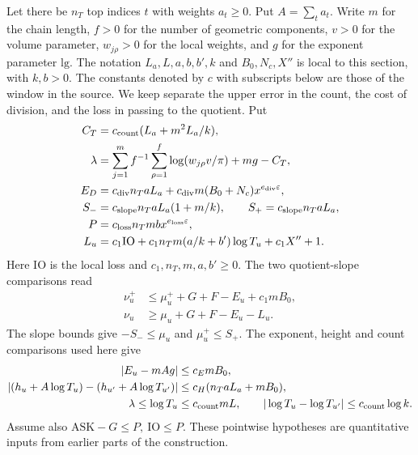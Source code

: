 Let there be \(n_T\) top indices \(t\) with weights \(a_t\ge0\).
Put \(A=\sum_t a_t\). Write \(m\) for the chain length, \(f>0\) for
the number of geometric components, \(v>0\) for the volume parameter,
\(w_{j\rho}>0\) for the local weights, and \(g\) for the exponent
parameter \(\mathrm{lg}\). The notation \(L_a,L,a,b,b',k\) and
\(B_0,N_c,X''\) is local to this section, with \(k,b>0\). The
constants denoted by \(c\) with subscripts below are those of the
window in the source. We keep separate the upper error in the count,
the cost of division, and the loss in passing to the quotient. Put
\begin{align*}
 C_T&=c_{\rm count}(L_a+m^2L_a/k),\\
 \lambda&=\sum_{j=1}^m f^{-1}\sum_{\rho=1}^f
            \log(w_{j\rho}v/\pi)+mg-C_T,\\
 E_D&=c_{\rm div}n_TaL_a+
          c_{\rm div}m(B_0+N_c)x^{e_{\rm div}\varepsilon},\\
 S_-&=c_{\rm slope}n_TaL_a(1+m/k),\qquad
 S_+=c_{\rm slope}n_TaL_a,\\
 P&=c_{\rm loss}n_Tmbx^{e_{\rm loss}\varepsilon},\\
 L_u&=c_1\mathrm{IO}+c_1 n_Tm(a/k+b')\log T_u+c_1 X''+1 .
\end{align*}
Here \(\mathrm{IO}\) is the local loss and \(c_1,n_T,m,a,b'\ge0\).
The two quotient-slope comparisons read
\begin{align*}
 \nu^+_u&\le\mu_u^++G+F-E_u+c_1mB_0,\\
 \nu_u&\ge\mu_u+G+F-E_u-L_u .
\end{align*}
The slope bounds give \(-S_-\le\mu_u\) and \(\mu^+_u\le S_+\).
The exponent, height and count comparisons used here give
\begin{align*}
 |E_u-mAg|&\le c_E m B_0,\\
 |(h_u+A\log T_u)-(h_{u'}+A\log T_{u'})|
       &\le c_H(n_T a L_a+mB_0),\\
 \lambda\le\log T_u&\le c_{\rm count}mL,\qquad
 |\log T_u-\log T_{u'}|\le c_{\rm count}\log k.
\end{align*}
Assume also \(\mathrm{ASK}-G\le P,\ \mathrm{IO}\le P\). These
pointwise hypotheses are quantitative inputs from earlier parts of
the construction.

